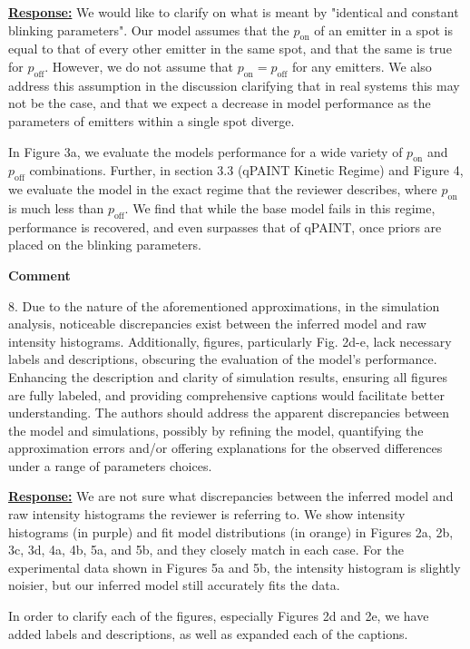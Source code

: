 \documentclass{article}
\begin{document}
\underline{\textbf{Response:}}
We would like to clarify on what is meant by "identical and constant blinking parameters". 
Our model assumes that the $p_\text{on}$ of an emitter in a spot is equal to that of every other 
emitter in the same spot, and that the same is true for $p_\text{off}$. However, we do not assume 
that $p_\text{on} = p_\text{off}$ for any emitters. We also address this assumption in the discussion 
clarifying that in real systems this may not be the case, and that we expect a decrease in model 
performance as the parameters of emitters within a single spot diverge. 

In Figure 3a, we evaluate the models performance for a wide variety of $p_\text{on}$ and $p_\text{off}$ 
combinations. Further, in section 3.3 (qPAINT Kinetic Regime) and Figure 4, we evaluate the model 
in the exact regime that the reviewer describes, where $p_\text{on}$ is much less than $p_\text{off}$. 
We find that while the base model fails in this regime, performance is recovered, and even 
surpasses that of qPAINT, once priors are placed on the blinking parameters. 

\textbf{Comment}

8.	Due to the nature of the aforementioned approximations, in the simulation analysis, 
noticeable discrepancies exist between the inferred model and raw intensity histograms. 
Additionally, figures, particularly Fig. 2d-e, lack necessary labels and descriptions, 
obscuring the evaluation of the model's performance. Enhancing the description and 
clarity of simulation results, ensuring all figures are fully labeled, and providing 
comprehensive captions would facilitate better understanding. 
The authors should address the apparent discrepancies between the model and simulations, 
possibly by refining the model, quantifying the approximation errors and/or offering 
explanations for the observed differences under a range of parameters choices.

\underline{\textbf{Response:}}
We are not sure what discrepancies between the inferred model and raw intensity histograms 
the reviewer is referring to. We show intensity histograms (in purple) and fit model 
distributions (in orange) in Figures 2a, 2b, 3c, 3d, 4a, 4b, 5a, and 5b, and they closely 
match in each case. For the experimental data shown in Figures 5a and 5b, the intensity histogram 
is slightly noisier, but our inferred model still accurately fits the data. 

In order to clarify each of the figures, especially Figures 2d and 2e, we have added 
labels and descriptions, as well as expanded each of the captions.
\end{document}
